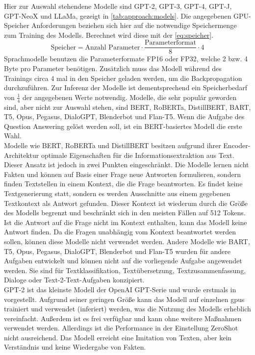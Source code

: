 Hier zur Auswahl stehendene Modelle sind GPT-2, GPT-3, GPT-4, GPT-J, GPT-NeoX und LLaMa, gezeigt in \cref{tab:approach:models}.
Die angegebenen GPU-Speicher Anforderungen beziehen sich hier auf die notwendige Speichermenge zum Training des Modells.
Berechnet wird diese mit der \cref{eq:speicher}.
\begin{equation}\label{eq:speicher}
    \text{Speicher}=\text{Anzahl Parameter} \cdot \frac{\text{Parameterformat}}{8} \cdot 4
\end{equation}
Sprachmodelle benutzen die Parameterformate FP16 oder FP32, welche 2 bzw. 4 Byte pro Parameter benötigen. Zusätzlich muss das Modell während des Trainings circa 4 mal in den Speicher geladen werden, um die Backpropagation durchzuführen. 
Zur Inferenz der Modelle ist dementsprechend ein Speicherbedarf von $\frac{1}{4}$ der angegebenen Werte notwendig.
Modelle, die sehr populär geworden sind, aber nicht zur Auswahl stehen, sind BERT, RoBERTa, DistillBERT, BART, T5, Opus, Pegasus, DialoGPT, Blenderbot und Flan-T5.
Wenn die Aufgabe des Question Answering gelöst werden soll, ist ein BERT-basiertes Modell die erste Wahl.\\

Modelle wie BERT, RoBERTa und DistillBERT besitzen aufgrund ihrer Encoder-Architektur optimale Eigenschaften für die Informationsextraktion aus Text.
Dieser Ansatz ist jedoch in zwei Punkten eingeschränkt.
Die Modelle lernen nicht Fakten und können auf Basis einer Frage neue Antworten formulieren, sondern finden Textstellen in einem Kontext, die die Frage beantworten.
Es findet keine Textgenerierung statt, sondern es werden Ausschnitte aus einem gegebenen Textkontext als Antwort gefunden.
Dieser Kontext ist wiederum durch die Größe des Modells begrenzt und beschränkt sich in den meisten Fällen auf 512 Tokens.
Ist die Antwort auf die Frage nicht im Kontext enthalten, kann das Modell keine Antwort finden.
Da die Fragen unabhängig vom Kontext beantwortet werden sollen, können diese Modelle nicht verwendet werden.
Andere Modelle wie BART, T5, Opus, Pegasus, DialoGPT, Blenderbot und Flan-T5 wurden für andere Aufgaben entwickelt und können nicht auf die vorliegende Aufgabe angewendet werden.
Sie sind für Textklassifikation, Textübersetzung, Textzusammenfassung, Dialoge oder Text-2-Text-Aufgaben konzipiert.\\

GPT-2 ist das kleinste Modell der OpenAI GPT-Serie und wurde erstmals in \citet{gpt2} vorgestellt.
Aufgrund seiner geringen Größe kann das Modell auf einzelnen \ac{gpu}s trainiert und verwendet (inferiert) werden, was die Nutzung des Modells erheblich vereinfacht.
Außerdem ist es frei verfügbar und kann ohne weitere Maßnahmen verwendet werden.
Allerdings ist die Performance in der Einstellung ZeroShot nicht ausreichend.
Das Modell erreicht eine Imitation von Texten, aber kein Verständnis und keine Wiedergabe von Fakten.\\

